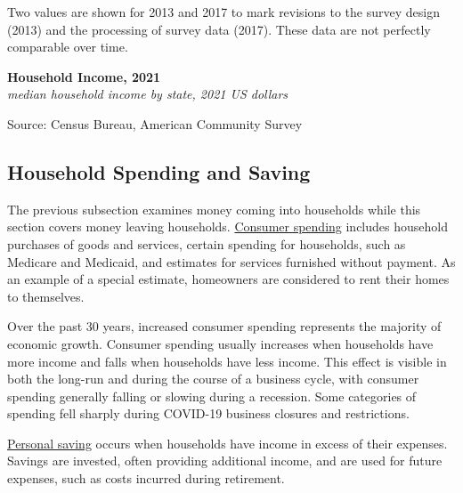 \documentclass{report}
\newcommand{\tbllink}[1]{\href{https://raw.githubusercontent.com/bdecon/US-chartbook/master/chartbook/data/#1}{\faTable}}
\begin{document}
{\begin{minipage}{0.345\textwidth}
Two values are shown for 2013 and 2017 to mark revisions to the survey design (2013) and the processing of survey data (2017). These data are not perfectly comparable over time. 
\end{minipage}
\newpage
\begin{minipage}{0.76\textwidth}
\small 
\end{minipage}
\vspace{1mm}

\normalsize \textbf{Household Income, 2021}\\
\footnotesize{\textit{median household income by state, 2021 US dollars}}
\vspace{-5mm}

\hspace{-5mm} 
\vspace{-6mm}

\begin{minipage}{0.76\textwidth} 
\footnotesize{Source: Census Bureau, American Community Survey} \hfill \tbllink{median_hh_inc_state.csv}
\end{minipage}
\newpage 
\begin{minipage}{0.76\textwidth}
\subsection*{Household Spending and Saving}
\hypertarget{hhss}{}
\small The previous subsection examines money coming into households while this section covers money leaving households. \href{https://www.bea.gov/data/consumer-spending/main}{Consumer spending} includes household purchases of goods and services, certain spending for households, such as Medicare and Medicaid, and estimates for services furnished without payment. As an example of a special estimate, homeowners are considered to rent their homes to themselves. 

Over the past 30 years, increased consumer spending represents the majority of economic growth. Consumer spending usually increases when households have more income and falls when households have less income. This effect is visible in both the long-run and during the course of a business cycle, with consumer spending generally falling or slowing during a recession. Some categories of spending fell sharply during COVID-19 business closures and restrictions.

\href{https://www.bea.gov/data/income-saving/personal-saving-rate}{Personal saving} occurs when households have income in excess of their expenses. Savings are invested, often providing additional income, and are used for future expenses, such as costs incurred during retirement.


\end{minipage}}
\end{document}
